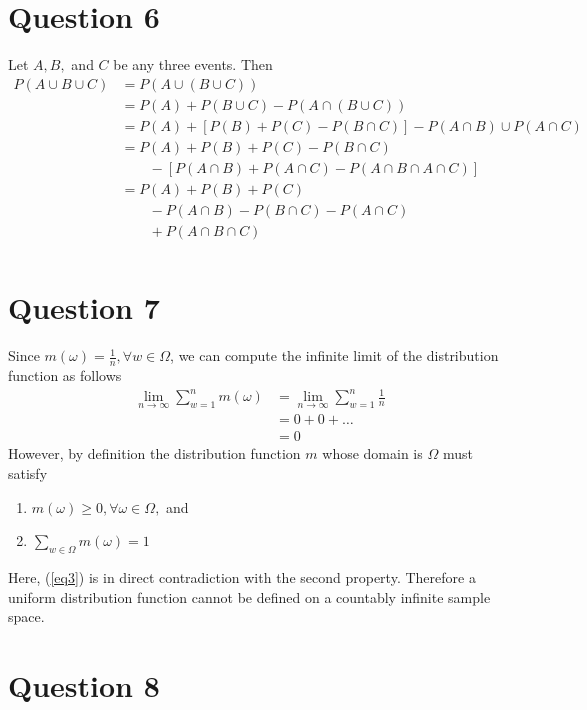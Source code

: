 \documentclass[11pt, oneside]{article}   	%
\begin{document}
\section*{Question 6}

Let $A, B,$ and $C$ be any three events. Then
\begin{align*}
	P(A \cup B \cup C) & = P(A \cup (B \cup C)) \\
	& = P(A) + P(B \cup C) - P(A \cap (B \cup C)) \\
	& = P(A) + [P(B) + P(C) - P(B \cap C)] - P(A \cap B) \cup P(A \cap C) \\
	& = P(A) + P(B) + P(C) - P(B \cap C) \\
	& \qquad - [P(A \cap B) + P(A \cap C) - P(A \cap B \cap A \cap C)] \\
	& = P(A) + P(B) + P(C) \\
	& \qquad - P(A \cap B) - P(B \cap C) - P(A \cap C) \\ 
	& \qquad + P(A \cap B \cap C) \\
\end{align*}

\section*{Question 7}

Since $m(\omega) = \frac{1}{n}, \forall w \in \Omega$, we can compute the infinite limit  of the distribution function as follows
\begin{align}
\lim_{n\to\infty} \sum_{w=1}^n m(\omega) & = \lim_{n\to\infty} \sum_{w=1}^n \frac{1}{n} \nonumber \\ 
&= 0 + 0 + \ldots \nonumber \\
& = 0 \label{eq3}
\end{align}
However, by definition the distribution function $m$ whose domain is $\Omega$ must satisfy
\begin{enumerate}
	\item $m(\omega) \geq 0, \forall \omega \in \Omega,$ and
	\item $\sum_{w \in \Omega} m(\omega) = 1$
\end{enumerate}

Here, (\ref{eq3}) is in direct contradiction with the second property. Therefore a uniform distribution function cannot be defined on a countably infinite sample space.

\section*{Question 8}
\end{document}
